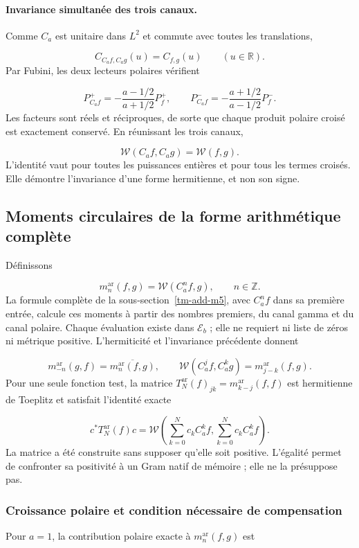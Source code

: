 \paragraph{Invariance simultanée des trois canaux.}
\label{tm-add:invariancia-weil} Comme \(C_a\) est unitaire dans \(L^2\) et commute avec toutes les translations,

\[
C_{C_af,C_ag}(u)=C_{f,g}(u)\qquad(u\in\mathbb R).
\]
Par Fubini, les deux lecteurs polaires vérifient

\[
P_{C_af}^+=-\frac{a-1/2}{a+1/2}P_f^+,
\qquad
P_{C_af}^-=-\frac{a+1/2}{a-1/2}P_f^-.
\]
Les facteurs sont réels et réciproques, de sorte que chaque produit polaire croisé est exactement conservé. En réunissant les trois canaux,

\[
\boxed{\mathscr W(C_af,C_ag)=\mathscr W(f,g).}
\]
L'identité vaut pour toutes les puissances entières et pour tous les termes croisés. Elle démontre l'invariance d'une forme hermitienne, et non son signe.


\subsection{Moments circulaires de la forme arithmétique complète}
\label{tm-add-m6}
Définissons

\[
m_n^{\mathrm{ar}}(f,g)=\mathscr W(C_a^n f,g),\qquad n\in\mathbb Z.
\]
La formule complète de la sous-section~\ref{tm-add-m5}, avec \(C_a^nf\) dans sa première entrée, calcule ces moments à partir des nombres premiers, du canal gamma et du canal polaire. Chaque évaluation existe dans \(\mathscr E_b\) ; elle ne requiert ni liste de zéros ni métrique positive. L'hermiticité et l'invariance précédente donnent

\[
m_{-n}^{\mathrm{ar}}(g,f)=\overline{m_n^{\mathrm{ar}}(f,g)},\qquad
\mathscr W(C_a^j f,C_a^k g)=m_{j-k}^{\mathrm{ar}}(f,g).
\]
Pour une seule fonction test, la matrice \(T_N^{\mathrm{ar}}(f)_{jk}=m_{k-j}^{\mathrm{ar}}(f,f)\) est hermitienne de Toeplitz et satisfait l'identité exacte

\[
c^*T_N^{\mathrm{ar}}(f)c
=\mathscr W\!\left(\sum_{k=0}^N c_k C_a^k f,
                    \sum_{k=0}^N c_k C_a^k f\right).
\]
La matrice a été construite sans supposer qu'elle soit positive. L'égalité permet de confronter sa positivité à un Gram natif de mémoire ; elle ne la présuppose pas.


\subsubsection{Croissance polaire et condition nécessaire de compensation}
\label{tm-add-m6-1}
Pour \(a=1\), la contribution polaire exacte à \(m_n^{\mathrm{ar}}(f,g)\) est

